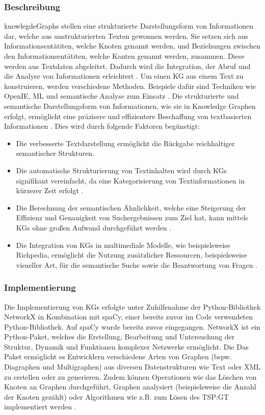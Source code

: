 \subsubsection{Beschreibung}
\ac{knowlegdeGraphs} stellen eine strukturierte Darstellungsform von Informationen dar, welche aus unstrukturierten Texten gewonnen werden. Sie setzen sich aus Informationsentätiten, welche Knoten genannt werden, und Beziehungen zwischen den Informationsentätiten, welche Kanten genannt werden, zusammen. Diese werden aus Textdaten abgeleitet. Dadurch wird die Integration, der Abruf und die Analyse von Informationen erleichtert \cite{Hojas-Mazo2018A}. Um einen KG aus einem Text zu konstruieren, werden verschiedene Methoden. Beispiele dafür sind Techniken wie \ac{OpenIE}, \ac{ML} und semantische Analyse zum Einsatz \cite{OpenIEbased}.
Die strukturierte und semantische Darstellungsform von Informationen, wie sie in Knowledge Graphen erfolgt, ermöglicht eine präzisere und effizientere Beschaffung von textbasierten Informationen \cite{Dietz2017Utilizing}. Dies wird durch folgende Faktoren begünstigt:
\begin{itemize}
    \item Die verbesserte Textdarstellung ermöglicht die Rückgabe reichhaltiger semantischer Strukturen. 
    \item Die automatische Strukturierung von Textinhalten wird durch KGs signifikant vereinfacht, da eine Kategorisierung von Textinformationen in kürzerer Zeit erfolgt \cite{Hojas-Mazo2018A}.
    \item Die Berechnung der semantischen Ähnlichkeit, welche eine Steigerung der Effizienz und Genauigkeit von Suchergebnissen zum Ziel hat, kann mittels KGs ohne großen Aufwand durchgeführt werden \cite{Wang2018Information}.
    \item Die Integration von KGs in multimediale Modelle, wie beispielsweise Richpedia, ermöglicht die Nutzung zusätzlicher Ressourcen, beispielsweise visueller Art, für die semantische Suche sowie die Beantwortung von Fragen \cite{Wang2020Richpedia:}.
\end{itemize}

\subsubsection{Implementierung}
Die Implementierung von KGs erfolgte unter Zuhilfenahme der Python-Bibliothek NetworkX in Kombination mit spaCy, einer bereits zuvor im Code verwendeten Python-Bibliothek. Auf spaCy wurde bereits zuvor eingegangen.
NetworkX ist ein Python-Paket, welches die Erstellung, Bearbeitung und Untersuchung der Struktur, Dynamik und Funktionen komplexer Netzwerke ermöglicht. 
Die  Das Paket ermöglicht es Entwicklern verschiedene Arten von Graphen (bspw. Diagraphen und Multigraphen) aus diversen Datenstrukturen wie Text oder XML zu erstellen oder zu generieren. Zudem können Operationen wie das Löschen von Knoten an Graphen durchgeführt, Graphen analysiert (beispielsweise die Anzahl der Knoten gezählt) oder Algorithmen wie z.B. zum Lösen des \ac{TSP:GT}  implementiert werden \cite{networkX:Docs}. 

